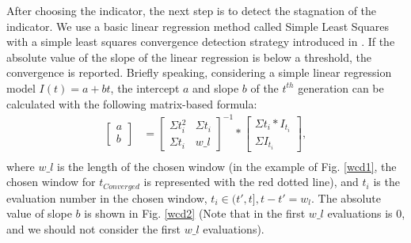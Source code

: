 \documentclass[conference]{IEEEtran}
\begin{document}
After choosing the indicator, the next step is to detect the stagnation of the indicator.
We use a basic linear regression method called Simple Least Squares\cite{SimpleLeastSquares} with a
simple least squares convergence detection strategy introduced in \cite{convergenceDetection:LSSC}.
If the absolute value of the slope of the linear regression is below a threshold, the convergence is reported.
Briefly speaking, considering a simple linear regression model $I(t)=a+bt$, 
the intercept $a$ and slope $b$ of the $t^{th}$ generation can be calculated 
with the following matrix-based formula:
\begin{equation}\begin{aligned}\label{elr1}
  \left[
    \begin{matrix}
      a \\
      b
    \end{matrix}
  \right]
  &= 
  \left[
    \begin{matrix}
      \Sigma t_i^2 & \Sigma t_i \\
      \Sigma t_i   & w\_l 
    \end{matrix}
  \right]^{-1}
  *
  \left[
    \begin{matrix}
      \Sigma t_i * I_{t_i} \\
      \Sigma I_{t_i} 
    \end{matrix}
  \right], \\
\end{aligned}
\end{equation}
where $w\_ l$ is the length of the chosen window
(in the example of Fig. \ref{wcd1}, the chosen window for $t_{Converged}$ is represented with the red dotted line), 
and $t_i$ is the evaluation number in the chosen window, $t_i \in (t',t], t - t' = w_l$.
The absolute value of slope $b$ is shown in Fig. \ref{wcd2} 
(Note that in the first $w\_ l$ evaluations is 0, 
and we should not consider the first $w\_ l$ evaluations). 
\end{document}
